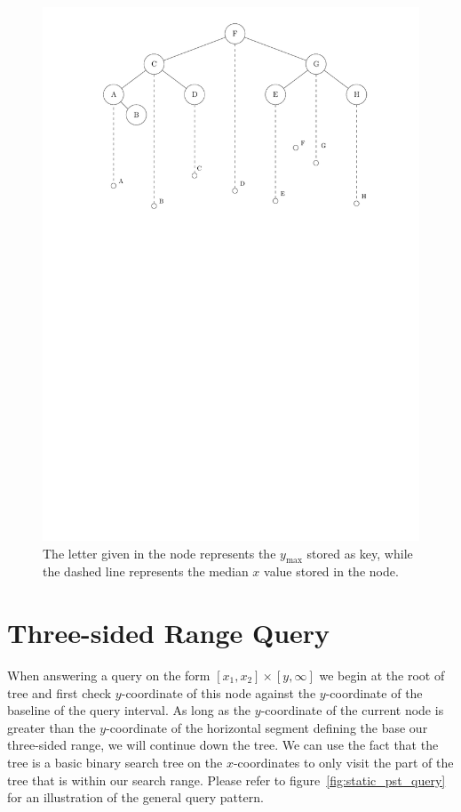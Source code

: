 \documentclass[twoside,11pt,openright]{report}
\begin{document}
\begin{figure}[h]
	\centering
	\includegraphics[scale=0.68]{../figures/internal_pst_static}
	\caption{The letter given in the node represents the $y_{\text{max}}$ stored as key, while the dashed line represents the median $x$ value stored in the node.}
	\label{fig:static_pst}
\end{figure}

\section{Three-sided Range Query}
When answering a query on the form $[x_1,x_2] \times [y,\infty]$ we begin at the root of tree and first check $y$-coordinate of this node against the $y$-coordinate of the baseline of the query interval. As long as the $y$-coordinate of the current node is greater than the $y$-coordinate of the horizontal segment defining the base our three-sided range, we will continue down the tree. We can use the fact that the tree is a basic binary search tree on the $x$-coordinates to only visit the part of the tree that is within our search range. Please refer to figure~\ref{fig:static_pst_query} for an illustration of the general query pattern.
\end{document}
